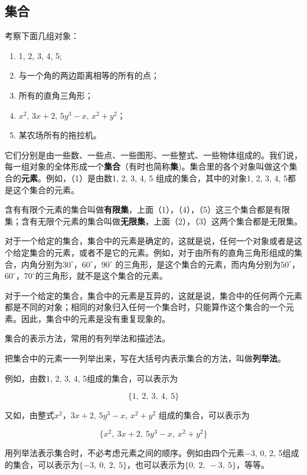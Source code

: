 \subsection{集合}

考察下面几组对象：

\begin{enumerate}[label=（\arabic*）, labelindent=\parindent, leftmargin=*]
    \item 1, 2, 3, 4, 5;
    \item 与一个角的两边距离相等的所有的点；
    \item 所有的直角三角形；
    \item $x^2$, $3x + 2$, $5y^3 - x$, $x^2 + y^2$；
    \item 某农场所有的拖拉机。
\end{enumerate}

它们分别是由一些数、一些点、一些图形、一些整式、一些物体组成的。我们说，每一组对象的全体形成一个\textbf{集合}（有时也简称\textbf{集})。集合里的各个对象叫做这个集合的\textbf{元素}。例如，（1）是由数1, 2, 3, 4, 5 组成的集合，其中的对象1, 2, 3, 4, 5都是这个集合的元素。

含有有限个元素的集合叫做\textbf{有限集}，上面（1），（4），（5）这三个集合都是有限集；含有无限个元素的集合叫做\textbf{无限集}，上面（2），（3）这两个集合都是无限集。

对于一个给定的集合，集合中的元素是确定的，这就是说，任何一个对象或者是这个给定集合的元素，或者不是它的元素。例如，对于由所有的直角三角形组成的集合，内角分别为$30^\circ$，$60^\circ$，$90^\circ$ 的三角形，是这个集合的元素，而内角分别为$50^\circ$，$60^\circ$，$70^\circ$的三角形，就不是这个集合的元素。

对于一个给定的集合，集合中的元素是互异的，这就是说，集合中的任何两个元素都是不同的对象；相同的对象归入任何一个集合时，只能算作这个集合的一个元素。因此，集合中的元素是没有重复现象的。

集合的表示方法，常用的有列举法和描述法。

把集合中的元素一一列举出来，写在大括号内表示集合的方法，叫做\textbf{列举法}。

例如，由数1, 2, 3, 4, 5组成的集合，可以表示为

$$\{1,\ 2,\ 3,\ 4,\ 5\}$$

又如，由整式$x^2$，$3x + 2$, $5y^3 - x$, $x^2 + y^2$ 组成的集合，可以表示为

$$\{x^2,\ 3x+2,\ 5y^3-x,\ x^2+y^2\}$$

用列举法表示集合时，不必考虑元素之间的顺序。例如由四个元素$-3$, 0, 2, 5组成的集合，可以表示为$\{-3,\ 0,\ 2,\ 5\}$，也可以表示为$\{0,\ 2,\ -3,\ 5\}$，等等。

